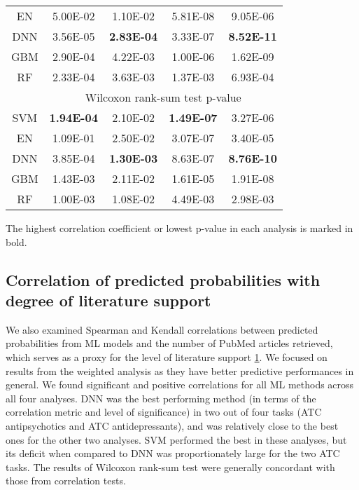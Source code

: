 \begin{table}[htbp]
\begin{threeparttable}
\begin{tabular}{ccccc}
        EN    & 5.00E-02 & 1.10E-02 & 5.81E-08 & 9.05E-06 \\
        DNN   & 3.56E-05 & \textbf{2.83E-04} & 3.33E-07 & \textbf{8.52E-11} \\
        GBM   & 2.90E-04 & 4.22E-03 & 1.00E-06 & 1.62E-09 \\
        RF    & 2.33E-04 & 3.63E-03 & 1.37E-03 & 6.93E-04 \\
        \midrule
              & \multicolumn{4}{c}{Wilcoxon rank-sum test p-value} \\
        SVM   & \textbf{1.94E-04} & 2.10E-02 & \textbf{1.49E-07} & 3.27E-06 \\
        EN    & 1.09E-01 & 2.50E-02 & 3.07E-07 & 3.40E-05 \\
        DNN   & 3.85E-04 & \textbf{1.30E-03} & 8.63E-07 & \textbf{8.76E-10} \\
        GBM   & 1.43E-03 & 2.11E-02 & 1.61E-05 & 1.91E-08 \\
        RF    & 1.00E-03 & 1.08E-02 & 4.49E-03 & 2.98E-03 \\
        \bottomrule
        \end{tabular}%
        \begin{tablenotes}
          \item The highest correlation coefficient or lowest p-value in each analysis is marked in bold.
        \end{tablenotes}
      \end{threeparttable}
      \label{tab:repurposing_correlation}%
    \end{table}%

  \subsection{Correlation of predicted probabilities with degree of literature support}
    We also examined Spearman and Kendall correlations between predicted probabilities from ML models and the number of PubMed articles retrieved, which serves as a proxy for the level of literature support \ref{tab:repurposing_correlation}. We focused on results from the weighted analysis as they have better predictive performances in general. We found significant and positive correlations for all ML methods across all four analyses. DNN was the best performing method (in terms of the correlation metric and level of significance) in two out of four tasks (ATC antipsychotics and ATC antidepressants), and was relatively close to the best ones for the other two analyses. SVM performed the best in these analyses, but its deficit when compared to DNN was proportionately large for the two ATC tasks. The results of Wilcoxon rank-sum test were generally concordant with those from correlation tests.
    
